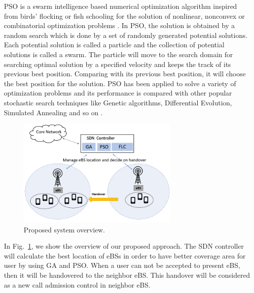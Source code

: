 \documentclass[graybox]{svmult}
\begin{document}
PSO is a swarm intelligence based numerical optimization algorithm inspired from birds’ flocking or fish schooling for the solution of nonlinear, nonconvex or combinatorial optimization problems
\cite{bansal2019evolutionary}. In PSO, the solution is obtained by a random search which is done by a set of randomly generated potential solutions. Each potential solution is called a particle and the collection of potential solutions is called a swarm. The particle will move to the search domain for searching optimal solution by a specified velocity and keeps the track of its previous best position. Comparing with its previous best position, it will choose the best position for the solution. PSO has been applied to solve a variety of optimization problems and its performance is
compared with other popular stochastic search techniques like Genetic algorithms, Differential Evolution, Simulated Annealing and so on \cite{Pant2009}. 

\begin{figure}[h]\centering
	\includegraphics[width=0.7\textwidth]{figure/GAhandover.png}
	\caption{Proposed system overview.}\label{fig:PShand}
\end{figure}

In Fig.~\ref{fig:PShand}, we show the overview of our proposed approach. The SDN controller will calculate the best location of eBSs in order to have better coverage area for user by using GA and PSO. When a user can not be accepted to present eBS, then it will be handovered to the neighbor eBS. This handover will be considered as a new call admission control in neighbor eBS.

\end{document}

